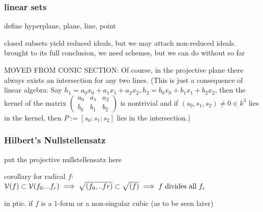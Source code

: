 \subsubsection{linear sets}
\begin{todo}
\item define hyperplane, plane, line, point
\item closed subsets yield reduced ideals, but we may attach non-reduced ideals. brought to its full conclusion, we need schemes, but we can do without so far
\item MOVED FROM CONIC SECTION: Of course, in the projective plane there always exists an intersection for any two lines.
(This is just a consequence of linear algebra: Say $h_1 = a_0x_0 + a_1x_1 + a_2x_2, h_2 = b_0x_0 + b_1x_1 + b_2x_2$, then the kernel of the matrix $\begin{pmatrix} a_0 & a_1 & a_2 \\ b_0 & b_1 & b_2 \end{pmatrix}$ is nontrivial and if $(s_0,s_1,s_2) \neq 0 \in k^3$ lies in the kernel, then $P := [s_0:s_1:s_2]$ lies in the intersection.)


\end{todo}

\subsubsection{Hilbert's Nullstellensatz}

\begin{todo}
\item put the projective nullstellensatz here
\item corollary for radical $f$: $\operatorname{\mathcal V}(f) \subset \operatorname{\mathcal V}(f_0,..f_r) \implies \sqrt{(f_0,..fr)} \subset \sqrt{(f)} \implies f \text{ divides all } f_i$
\item in ptic. if $f$ is a 1-form or a non-singular cubic (as to be seen later)
\end{todo}
